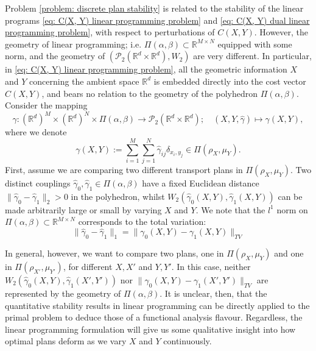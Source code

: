 \documentclass[11pt, oneside, titlepage]{book}
\theoremstyle{plain}
\theoremstyle{definition}
\newcommand{\R}{\mathbb{R}}
\begin{document}
Problem \ref{problem: discrete plan stability} is related to the stability of the linear programs \eqref{eq: C(X, Y) linear programming problem} and \eqref{eq: C(X, Y) dual linear programming problem}, with respect to perturbations of $C(X, Y)$. However, the geometry of linear programming; i.e. $\Pi(\alpha, \beta) \subset \R^{M \times N}$ equipped with some norm, and the geometry of $(\mathcal{P}_2(\R^d \times \R^d), W_2)$ are very different. In particular, in \eqref{eq: C(X, Y) linear programming problem}, all the geometric information $X$ and $Y$ concerning the ambient space $\R^d$ is embedded directly into the cost vector $C(X, Y)$, and bears no relation to the geometry of the polyhedron $\Pi(\alpha, \beta)$. Consider the mapping
\begin{equation*}
    \gamma : (\R^d)^M \times (\R^d)^N \times \Pi(\alpha, \beta) \to \mathcal{P}_2(\R^d \times \R^d); \quad (X, Y, \hat\gamma) \mapsto \gamma(X, Y),
\end{equation*}
where we denote
\begin{equation*}
    \gamma(X, Y)  := \sum_{i=1}^M \sum_{j=1}^N \hat\gamma_{ij} \delta_{x_i, y_j} \in \Pi(\rho_X, \mu_Y).
\end{equation*}
First, assume we are comparing two different transport plans in $\Pi(\rho_X, \mu_Y)$. Two distinct couplings $\hat\gamma_0, \hat\gamma_1 \in \Pi(\alpha, \beta)$ have a fixed Euclidean distance $\| \hat \gamma_0 - \hat \gamma_1\|_2>0$ in the polyhedron, whilst $W_2(\hat\gamma_0(X, Y), \hat\gamma_1(X, Y))$ can be made arbitrarily large or small by varying $X$ and $Y$. We note that the $l^1$ norm on $\Pi(\alpha, \beta) \subset \R^{M \times N}$ corresponds to the total variation:
\begin{equation*}
    \|\hat \gamma_0 - \hat \gamma_1\|_1 = \| \gamma_0(X, Y) - \gamma_1(X, Y)\|_{TV}
\end{equation*}

In general, however, we want to compare two plans, one in $\Pi(\rho_{X}, \mu_Y)$ and one in $\Pi(\rho_{X'}, \mu_{Y'})$, for different $X, X'$ and $Y, Y'$. In this case, neither $W_2(\hat\gamma_0(X, Y), \hat\gamma_1(X', Y'))$ nor  $\|\gamma_0(X, Y) - \gamma_1(X', Y')\|_{TV}$ are represented by the geometry of $\Pi(\alpha, \beta)$. It is unclear, then, that the quantitative stability results in linear programming can be directly applied to the primal problem to deduce those of a functional analysis flavour. Regardless, the linear programming formulation will give us some qualitative insight into how optimal plans deform as we vary $X$ and $Y$ continuously.
\end{document}
